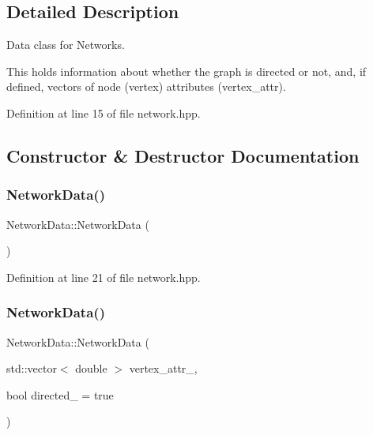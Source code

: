 \subsection{Detailed Description}
Data class for Networks. 

This holds information about whether the graph is directed or not, and, if defined, vectors of node (vertex) attributes ({\ttfamily vertex\+\_\+attr}). 

Definition at line 15 of file network.\+hpp.



\subsection{Constructor \& Destructor Documentation}
\mbox{\label{class_network_data_af62a7dde71c52bc49bc1e0ddc27b4724}} 
\subsubsection{\texorpdfstring{Network\+Data()}{NetworkData()}\hspace{0.1cm}{\footnotesize\ttfamily [1/3]}}
{\footnotesize\ttfamily Network\+Data\+::\+Network\+Data (\begin{DoxyParamCaption}{ }\end{DoxyParamCaption})\hspace{0.3cm}{\ttfamily [inline]}}



Definition at line 21 of file network.\+hpp.

\mbox{\label{class_network_data_a431d2c3a6cf9f61437643b767821e4a5}} 
\subsubsection{\texorpdfstring{Network\+Data()}{NetworkData()}\hspace{0.1cm}{\footnotesize\ttfamily [2/3]}}
{\footnotesize\ttfamily Network\+Data\+::\+Network\+Data (\begin{DoxyParamCaption}\item[{std\+::vector$<$ double $>$}]{vertex\+\_\+attr\+\_\+,  }\item[{bool}]{directed\+\_\+ = {\ttfamily true} }\end{DoxyParamCaption})\hspace{0.3cm}{\ttfamily [inline]}}




